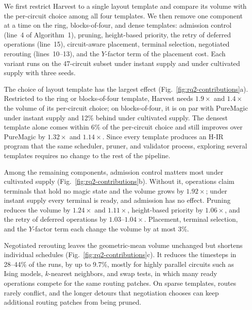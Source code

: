 

We first restrict Harvest to a single layout template and compare its volume with the per-circuit choice among all four templates.
We then remove one component at a time on the ring, blocks-of-four, and dense templates: admission control (line~4 of Algorithm~1), pruning, height-based priority, the retry of deferred operations (line~15), circuit-aware placement, terminal selection, negotiated rerouting (lines~10--13), and the $Y$-factor term of the placement cost.
Each variant runs on the 47-circuit subset under instant supply and under cultivated supply with three seeds.

The choice of layout template has the largest effect (Fig.~\ref{fig:rq2-contributions}a).
Restricted to the ring or blocks-of-four template, Harvest needs $1.9\times$ and $1.4\times$ the volume of its per-circuit choice; on blocks-of-four, it is on par with PureMagic under instant supply and 12\% behind under cultivated supply.
The densest template alone comes within 6\% of the per-circuit choice and still improves over PureMagic by $1.32\times$ and $1.14\times$.
Since every template produces an H-IR program that the same scheduler, pruner, and validator process, exploring several templates requires no change to the rest of the pipeline.

Among the remaining components, admission control matters most under cultivated supply (Fig.~\ref{fig:rq2-contributions}b).
Without it, operations claim terminals that hold no magic state and the volume grows by $1.92\times$; under instant supply every terminal is ready, and admission has no effect.
Pruning reduces the volume by $1.24\times$ and $1.11\times$, height-based priority by $1.06\times$, and the retry of deferred operations by $1.03$--$1.04\times$.
Placement, terminal selection, and the $Y$-factor term each change the volume by at most 3\%.

Negotiated rerouting leaves the geometric-mean volume unchanged but shortens individual schedules (Fig.~\ref{fig:rq2-contributions}c).
It reduces the timesteps in 28--44\% of the runs, by up to 9.7\%, mostly for highly parallel circuits such as Ising models, $k$-nearest neighbors, and swap tests, in which many ready operations compete for the same routing patches.
On sparse templates, routes rarely conflict, and the longer detours that negotiation chooses can keep additional routing patches from being pruned.


